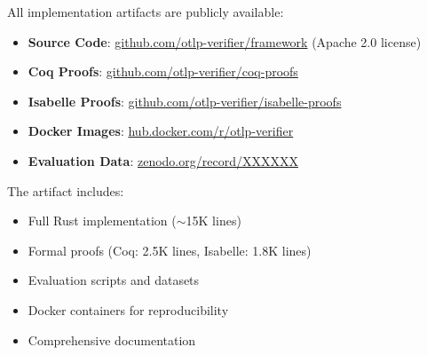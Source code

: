 All implementation artifacts are publicly available:
\begin{itemize}
\item \textbf{Source Code}: \url{github.com/otlp-verifier/framework} (Apache 2.0 license)
\item \textbf{Coq Proofs}: \url{github.com/otlp-verifier/coq-proofs}
\item \textbf{Isabelle Proofs}: \url{github.com/otlp-verifier/isabelle-proofs}
\item \textbf{Docker Images}: \url{hub.docker.com/r/otlp-verifier}
\item \textbf{Evaluation Data}: \url{zenodo.org/record/XXXXXX}
\end{itemize}

The artifact includes:
\begin{itemize}
\item Full Rust implementation ($\sim$15K lines)
\item Formal proofs (Coq: 2.5K lines, Isabelle: 1.8K lines)
\item Evaluation scripts and datasets
\item Docker containers for reproducibility
\item Comprehensive documentation
\end{itemize}
